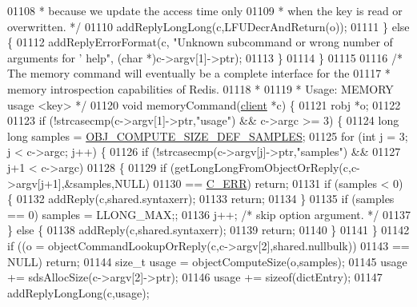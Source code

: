 \begin{DoxyCode}
{{{01108 \textcolor{comment}{         * because we update the access time only}
01109 \textcolor{comment}{         * when the key is read or overwritten. */}
01110         addReplyLongLong(c,LFUDecrAndReturn(o));
01111     \} \textcolor{keywordflow}{else} \{
01112         addReplyErrorFormat(c, \textcolor{stringliteral}{"Unknown subcommand or wrong number of arguments for '%
       help"}, (\textcolor{keywordtype}{char} *)c->argv[1]->ptr);
01113     \}
01114 \}
01115 
01116 \textcolor{comment}{/* The memory command will eventually be a complete interface for the}
01117 \textcolor{comment}{ * memory introspection capabilities of Redis.}
01118 \textcolor{comment}{ *}
01119 \textcolor{comment}{ * Usage: MEMORY usage <key> */}
01120 \textcolor{keywordtype}{void} memoryCommand(\hyperlink{structclient}{client} *c) \{
01121     robj *o;
01122 
01123     \textcolor{keywordflow}{if} (!strcasecmp(c->argv[1]->ptr,\textcolor{stringliteral}{"usage"}) && c->argc >= 3) \{
01124         \textcolor{keywordtype}{long} \textcolor{keywordtype}{long} samples = \hyperlink{object_8c_a46d9ae99d237582e21c70e7de56a032e}{OBJ\_COMPUTE\_SIZE\_DEF\_SAMPLES};
01125         \textcolor{keywordflow}{for} (\textcolor{keywordtype}{int} j = 3; j < c->argc; j++) \{
01126             \textcolor{keywordflow}{if} (!strcasecmp(c->argv[j]->ptr,\textcolor{stringliteral}{"samples"}) &&
01127                 j+1 < c->argc)
01128             \{
01129                 \textcolor{keywordflow}{if} (getLongLongFromObjectOrReply(c,c->argv[j+1],&samples,NULL)
01130                      == \hyperlink{server_8h_af98ac28d5f4d23d7ed5985188e6fb7d1}{C\_ERR}) \textcolor{keywordflow}{return};
01131                 \textcolor{keywordflow}{if} (samples < 0) \{
01132                     addReply(c,shared.syntaxerr);
01133                     \textcolor{keywordflow}{return};
01134                 \}
01135                 \textcolor{keywordflow}{if} (samples == 0) samples = LLONG\_MAX;;
01136                 j++; \textcolor{comment}{/* skip option argument. */}
01137             \} \textcolor{keywordflow}{else} \{
01138                 addReply(c,shared.syntaxerr);
01139                 \textcolor{keywordflow}{return};
01140             \}
01141         \}
01142         \textcolor{keywordflow}{if} ((o = objectCommandLookupOrReply(c,c->argv[2],shared.nullbulk))
01143                 == NULL) \textcolor{keywordflow}{return};
01144         size\_t usage = objectComputeSize(o,samples);
01145         usage += sdsAllocSize(c->argv[2]->ptr);
01146         usage += \textcolor{keyword}{sizeof}(dictEntry);
01147         addReplyLongLong(c,usage);
}}}
\end{DoxyCode}
